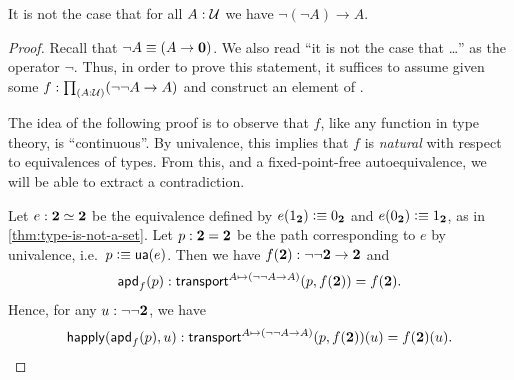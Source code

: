 \begin{thm}\label{thm:not-dneg}
  It is not the case that for all $A:\mathcal{U}$ we have $\neg(\neg A) \to A$.
\end{thm}
\begin{proof}
  Recall that $\neg A \equiv (A\to\mathbf{0})$.
  We also read ``it is not the case that \dots'' as the operator $\neg$.
  Thus, in order to prove this statement, it suffices to assume given some $f:\prd{A:\UU} (\neg\neg A \to A)$ and construct an element of \emptyt.

  The idea of the following proof is to observe that $f$, like any function in type theory, is ``continuous''.
  By univalence, this implies that $f$ is \emph{natural} with respect to equivalences of types.
  From this, and a fixed-point-free autoequivalence, we will be able to extract a contradiction.

  Let $e:\mathbf{2} \simeq \mathbf{2}$ be the equivalence defined by $e({1_{\mathbf{2}}})\vcentcolon\equiv{0_{\ensuremath{\mathbf{2}}}}$ and $e({0_{\mathbf{2}}})\vcentcolon\equiv{1_{\ensuremath{\mathbf{2}}}}$, as in \autoref{thm:type-is-not-a-set}.
  Let $p:\mathbf{2}=\mathbf{2}$ be the path corresponding to $e$ by univalence, i.e.\ $p\vcentcolon\equiv \mathsf{ua}(e)$.
  Then we have $f(\mathbf{2}) : \neg\neg\mathbf{2} \to\mathbf{2}$ and
  \[\mathsf{apd}_{f}\mathopen{}\left(p\right)\mathclose{} : \mathsf{transport}^{A\mapsto (\neg\neg A \to A)}(p,f(\mathbf{2})) = f(\mathbf{2}).\]
  Hence, for any $u:\neg\neg\mathbf{2}$, we have
  \[\mathsf{happly}(\mathsf{apd}_{f}\mathopen{}\left(p\right)\mathclose{},u) : \mathsf{transport}^{A\mapsto (\neg\neg A \to A)}(p,f(\mathbf{2}))(u) = f(\mathbf{2})(u).\]


\end{proof}
